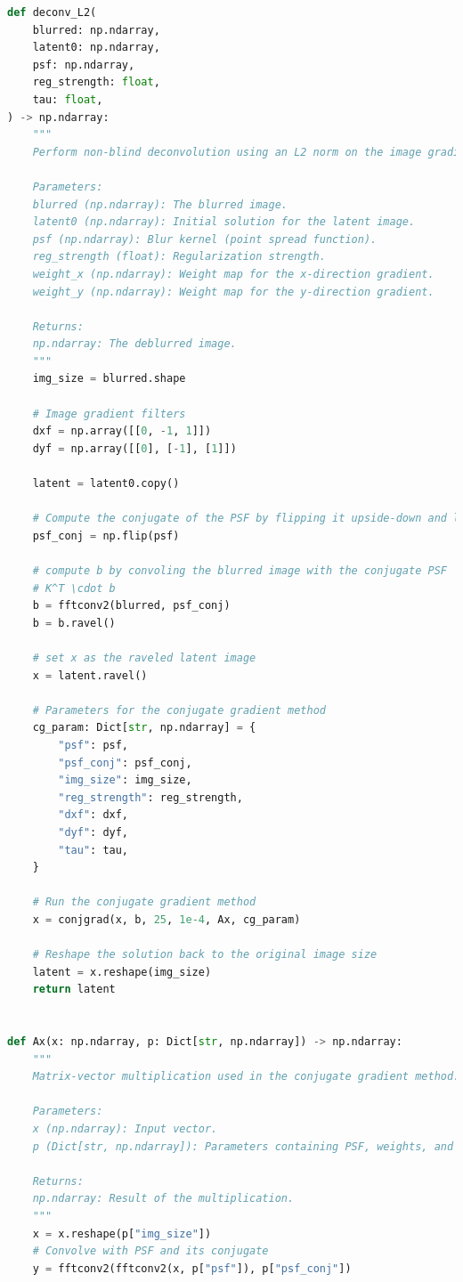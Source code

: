 \documentclass{report}
\begin{document}
\begin{lstlisting}[language=Python, caption=Modified Code, firstnumber=90]
def deconv_L2(
    blurred: np.ndarray,
    latent0: np.ndarray,
    psf: np.ndarray,
    reg_strength: float,
    tau: float,
) -> np.ndarray:
    """
    Perform non-blind deconvolution using an L2 norm on the image gradient.

    Parameters:
    blurred (np.ndarray): The blurred image.
    latent0 (np.ndarray): Initial solution for the latent image.
    psf (np.ndarray): Blur kernel (point spread function).
    reg_strength (float): Regularization strength.
    weight_x (np.ndarray): Weight map for the x-direction gradient.
    weight_y (np.ndarray): Weight map for the y-direction gradient.

    Returns:
    np.ndarray: The deblurred image.
    """
    img_size = blurred.shape

    # Image gradient filters
    dxf = np.array([[0, -1, 1]])
    dyf = np.array([[0], [-1], [1]])

    latent = latent0.copy()

    # Compute the conjugate of the PSF by flipping it upside-down and left-and-right
    psf_conj = np.flip(psf)

    # compute b by convoling the blurred image with the conjugate PSF
    # K^T \cdot b
    b = fftconv2(blurred, psf_conj)
    b = b.ravel()

    # set x as the raveled latent image
    x = latent.ravel()

    # Parameters for the conjugate gradient method
    cg_param: Dict[str, np.ndarray] = {
        "psf": psf,
        "psf_conj": psf_conj,
        "img_size": img_size,
        "reg_strength": reg_strength,
        "dxf": dxf,
        "dyf": dyf,
        "tau": tau,
    }

    # Run the conjugate gradient method
    x = conjgrad(x, b, 25, 1e-4, Ax, cg_param)

    # Reshape the solution back to the original image size
    latent = x.reshape(img_size)
    return latent


def Ax(x: np.ndarray, p: Dict[str, np.ndarray]) -> np.ndarray:
    """
    Matrix-vector multiplication used in the conjugate gradient method.

    Parameters:
    x (np.ndarray): Input vector.
    p (Dict[str, np.ndarray]): Parameters containing PSF, weights, and gradients.

    Returns:
    np.ndarray: Result of the multiplication.
    """
    x = x.reshape(p["img_size"])
    # Convolve with PSF and its conjugate
    y = fftconv2(fftconv2(x, p["psf"]), p["psf_conj"])


\end{lstlisting}
\end{document}
